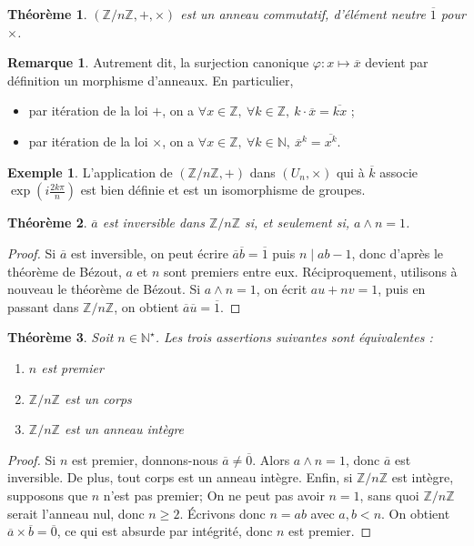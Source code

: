 \documentclass[french]{book}
\newcommand{\N}{\mathbb{N}}
\newcommand{\Z}{\mathbb{Z}}
\newcommand{\st}{^\star}
\theoremstyle{plain}
\newtheorem{thm}{Théorème}[chapter]
\theoremstyle{definition}
\newtheorem{exa}{Exemple}[chapter]
\newtheorem{rmq}{Remarque}[chapter]
\theoremstyle{remark}
\begin{document}
\begin{thm}
	$(\Z/n\Z,+,\times)$ est un anneau commutatif, d'élément neutre $\overline{1}$ pour $\times$.
\end{thm}
\begin{rmq}
	Autrement dit, la surjection canonique $\varphi:x\mapsto\overline{x}$ devient par définition un morphisme d'anneaux. En particulier,
	\begin{itemize}
		\item par itération de la loi $+$, on a $\forall x\in\Z,\ \forall k\in\Z,\ k\cdot\overline{x}=\overline{kx}$ ;
		\item par itération de la loi $\times$, on a $\forall x\in\Z,\ \forall k\in\N,\ \overline{x}^k=\overline{x^k}$.
	\end{itemize}
\end{rmq}
\begin{exa}
	L'application de $(\Z/n\Z,+)$ dans $(U_n,\times)$ qui à $\overline{k}$ associe $\exp\left(i\frac{2k\pi}{n}\right)$ est bien définie et est un isomorphisme de groupes.
\end{exa}
\begin{thm}
	$\overline{a}$ est inversible dans $\Z/n\Z$ si, et seulement si, $a\wedge n=1$.
\end{thm}
\begin{proof}
	Si $\overline{a}$ est inversible, on peut écrire $\overline{a}\overline{b}=\overline{1}$ puis $n\mid ab-1$, donc d'après le théorème de Bézout, $a$ et $n$ sont premiers entre eux. Réciproquement, utilisons à nouveau le théorème de Bézout. Si $a\wedge n=1$, on écrit $au+nv=1$, puis en passant dans $\Z/n\Z$, on obtient $\overline{a}\overline{u}=\overline{1}$.
\end{proof}
\begin{thm}
	Soit $n\in\N\st$. Les trois assertions suivantes sont équivalentes :
	\begin{enumerate}
		\item $n$ est premier
		\item $\Z/n\Z$ est un corps
		\item $\Z/n\Z$ est un anneau intègre
	\end{enumerate}
\end{thm}
\begin{proof}
	Si $n$ est premier, donnons-nous $\overline{a}\ne\overline{0}$. Alors $a\wedge n=1$, donc $\overline{a}$ est inversible. De plus, tout corps est un anneau intègre. Enfin, si $\Z/n\Z$ est intègre, supposons que $n$ n'est pas premier; On ne peut pas avoir $n=1$, sans quoi $\Z/n\Z$ serait l'anneau nul, donc $n\geqslant2$. Écrivons donc $n=ab$ avec $a,b<n$. On obtient $\overline{a}\times\overline{b}=\overline{0}$, ce qui est absurde par intégrité, donc $n$ est premier.
\end{proof}
\end{document}
